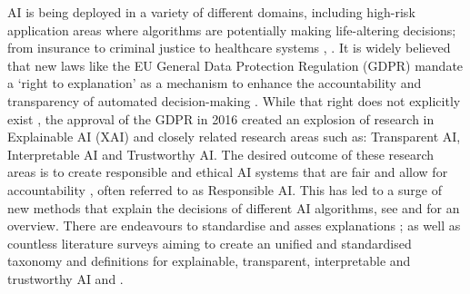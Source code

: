 \documentclass[manuscript,screen,review]{acmart}
\begin{document}



AI is being deployed in a variety of different domains, including high-risk application areas where algorithms are potentially making life-altering decisions; from insurance to criminal justice to healthcare systems \cite{Bohr2020}, \cite{Chen2018}. It is widely believed that new laws like the EU General Data Protection Regulation (GDPR) mandate a ‘right to explanation’ as a mechanism to enhance the accountability and transparency of automated decision-making \cite{Wachter2017}. While that right does not explicitly exist \cite{Wachter2017}, the approval of the GDPR in 2016 created an explosion of research in Explainable AI (XAI) and closely related research areas such as: Transparent AI, Interpretable AI and Trustworthy AI. The desired outcome of these research areas is to create responsible and ethical AI systems that are fair and allow for accountability \cite{Mohseni2021}, often referred to as Responsible AI. This has led to a surge of new methods that explain the decisions of different AI algorithms, see \cite{Linardatos2021} and \cite{Guidotti2018a} for an overview. There are endeavours to standardise and asses explanations \cite{Gilpin2019}; as well as countless literature surveys aiming to create an unified and standardised taxonomy and definitions for explainable, transparent, interpretable and trustworthy AI \cite{Schwalbe2021} and \cite{Arrieta2020}.\\\\
\end{document}
